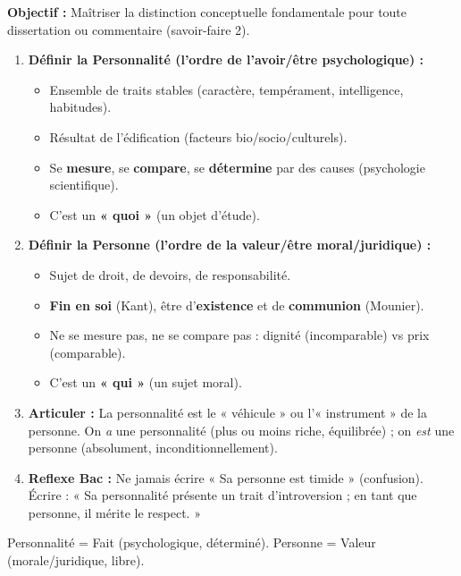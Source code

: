 \documentclass[11pt]{article}
\newcommand{\cle}[1]{{\popxbold\color{popdark}#1}}
\begin{document}
\begin{methode}
\textbf{Objectif :} Maîtriser la distinction conceptuelle fondamentale pour toute dissertation ou commentaire (savoir-faire 2).
\begin{enumerate}
    \item \textbf{Définir la Personnalité (l'ordre de l'avoir/être psychologique) :}
    \begin{itemize}
        \item Ensemble de traits stables (caractère, tempérament, intelligence, habitudes).
        \item Résultat de l'édification (facteurs bio/socio/culturels).
        \item Se \textbf{mesure}, se \textbf{compare}, se \textbf{détermine} par des causes (psychologie scientifique).
        \item C'est un \textbf{« quoi »} (un objet d'étude).
    \end{itemize}
    \item \textbf{Définir la Personne (l'ordre de la valeur/être moral/juridique) :}
    \begin{itemize}
        \item Sujet de droit, de devoirs, de responsabilité.
        \item \textbf{Fin en soi} (Kant), être d'\textbf{existence} et de \textbf{communion} (Mounier).
        \item Ne se mesure pas, ne se compare pas : \cle{dignité} (incomparable) vs \cle{prix} (comparable).
        \item C'est un \textbf{« qui »} (un sujet moral).
    \end{itemize}
    \item \textbf{Articuler :} La personnalité est le « véhicule » ou l'« instrument » de la personne. On \emph{a} une personnalité (plus ou moins riche, équilibrée) ; on \emph{est} une personne (absolument, inconditionnellement).
    \item \textbf{Reflexe Bac :} Ne jamais écrire « Sa personne est timide » (confusion). Écrire : « Sa personnalité présente un trait d'introversion ; en tant que personne, il mérite le respect. »
\end{enumerate}
\cle{Personnalité = Fait (psychologique, déterminé). Personne = Valeur (morale/juridique, libre).}
\end{methode}
\end{document}
